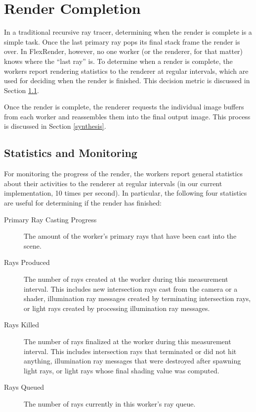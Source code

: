 \documentclass[12pt]{ucthesis}
\begin{document}
\section{Render Completion}
\label{completion}

In a traditional recursive ray tracer, determining when the render is complete
is a simple task. Once the last primary ray pops its final stack frame
the render is over. In FlexRender, however, no one worker (or the renderer, for
that matter) knows where the ``last ray'' is. To determine when a render is
complete, the workers report rendering statistics to the renderer at regular
intervals, which are used for deciding when the render is finished. This decision
metric is discussed in Section \ref{stats}.

Once the render is complete, the renderer requests the individual image buffers
from each worker and reassembles them into the final output image. This process
is discussed in Section \ref{synthesis}.

\subsection{Statistics and Monitoring}
\label{stats}

For monitoring the progress of the render, the workers report general statistics
about their activities to the renderer at regular intervals (in our current
implementation, 10 times per second). In particular, the following four
statistics are useful for determining if the render has finished:

\begin{description}
   \item[Primary Ray Casting Progress] The amount of the worker's primary rays
      that have been cast into the scene.
   \item[Rays Produced] The number of rays created at the worker during this
      measurement interval. This includes new intersection rays cast from the
      camera or a shader, illumination ray messages created by terminating intersection
      rays, or light rays created by processing illumination ray messages.
   \item[Rays Killed] The number of rays finalized at the worker during this
      measurement interval. This includes intersection rays that terminated or
      did not hit anything, illumination ray messages that were destroyed after spawning
      light rays, or light rays whose final shading value was computed.
   \item[Rays Queued] The number of rays currently in this worker's ray queue.
\end{description}
\end{document}
